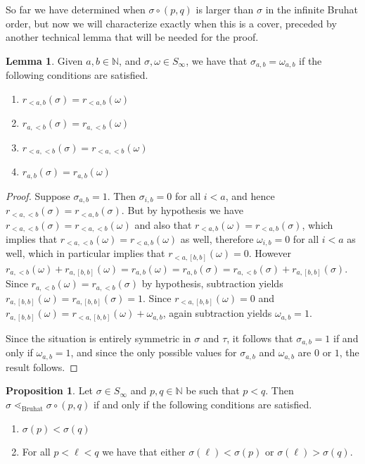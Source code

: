 \documentclass[oneside,11pt,reqno]{amsart}
\newcommand{\nn}{\ensuremath{\mathbb{N}}}
\theoremstyle{definition}
\newtheorem{proof techniques}{Proof Techniques}
\newtheorem{lemma}{Lemma}
\newtheorem{proposition}{Proposition}
\begin{document}
So far we have determined when $\sigma \circ (p , q)$ is larger than $\sigma$ in the infinite Bruhat order, but now we will characterize exactly when this is a cover, preceded by another technical lemma that will be needed for the proof. 

\begin{lemma}\label{lem: criteria for equal permutation matrices}
    Given $a , b \in \nn$, and $\sigma , \omega \in S_\infty$, we have that $\sigma_{a , b} = \omega_{a , b}$ if the following conditions are satisfied.  
    \begin{enumerate}
        \item $r_{<a , b}(\sigma) = r_{<a , b}(\omega)$
        \item $r_{a , <b}(\sigma) = r_{a , <b}(\omega)$
        \item $r_{<a , <b}(\sigma) = r_{<a , <b}(\omega)$
        \item $r_{a , b}(\sigma) = r_{a , b}(\omega)$
    \end{enumerate} 
\end{lemma}

\begin{proof}
Suppose $\sigma_{a , b} = 1$. Then $\sigma_{i , b} = 0$ for all $i < a$, and hence $r_{< a , < b}(\sigma) = r_{< a , b}(\sigma)$. But by hypothesis we have $r_{< a , < b}(\sigma) = r_{< a , < b}(\omega)$ and also that $r_{< a , b}(\omega) = r_{< a , b}(\sigma)$, which implies that $r_{< a , < b}(\omega) = r_{< a , b}(\omega)$ as well, therefore $\omega_{i , b} = 0$ for all $i < a$ as well, which in particular implies that $r_{<a , [b , b]}(\omega) = 0$. However $r_{a , < b}(\omega) + r_{a , [b , b]}(\omega) = r_{a , b}(\omega) 
= r_{a , b}(\sigma) = r_{a , < b}(\sigma) + r_{a , [b , b]}(\sigma)$. Since $r_{a , < b}(\omega) = r_{a , < b}(\sigma)$ by hypothesis, subtraction yields $r_{a , [b , b]}(\omega) = r_{a , [b , b]}(\sigma) = 1$. Since $r_{<a , [b , b]}(\omega) = 0$ and $r_{a , [b , b]}(\omega) = r_{<a , [b , b]}(\omega) + \omega_{a , b}$, again subtraction yields $\omega_{a , b} = 1$. 

Since the situation is entirely symmetric in $\sigma$ and $\tau$, it follows that $\sigma_{a , b} = 1$ if and only if $\omega_{a , b} = 1$, and since the only possible values for $\sigma_{a , b}$ and $\omega_{a , b}$ are $0$ or $1$, the result follows.
\end{proof}

\begin{proposition}\label{prop: cover relations in the bruhat order}
    Let $\sigma \in S_\infty$ and $p, q \in \nn$ be such that $p < q$. Then $\sigma \lessdot_\text{Bruhat} \sigma \circ (p , q)$ if and only if the following conditions are satisfied. 
    \begin{enumerate}
        \item[(C1)] $\sigma(p) < \sigma(q)$
        \item[(C2)] For all $p < \ell < q$ we have that either $\sigma(\ell) < \sigma(p)$ or $\sigma(\ell) > \sigma(q)$.
    \end{enumerate}
\end{proposition}
\end{document}
